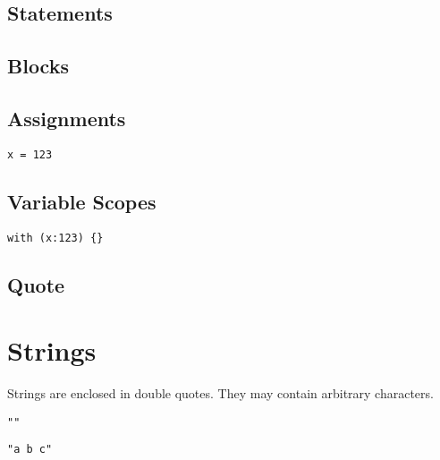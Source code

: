 \documentclass[11pt,a4paper]{scrbook}
\begin{document}

\subsection{Statements}


\subsection{Blocks}


\subsection{Assignments}

\begin{lstlisting}[language=BibTool]
x = 123
\end{lstlisting}

\subsection{Variable Scopes}


\begin{lstlisting}[language=BibTool]
with (x:123) {}
\end{lstlisting}

\subsection{Quote}


\section{Strings}

Strings are enclosed in double quotes. They may contain arbitrary characters.

\begin{lstlisting}[language=BibTool]
""
\end{lstlisting}

\begin{lstlisting}[language=BibTool]
"a b c"
\end{lstlisting}
\end{document}
